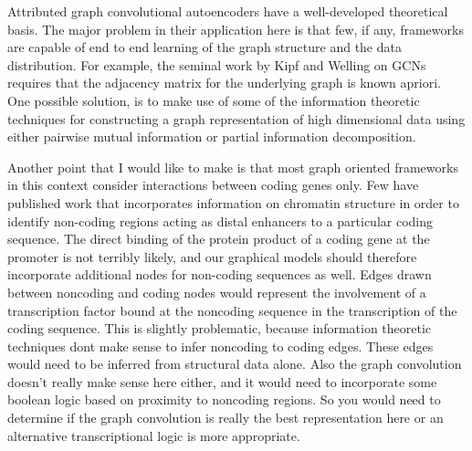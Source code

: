 \documentclass{article}
\begin{document}
Attributed graph convolutional autoencoders have a well-developed theoretical basis. The major problem in their application here is that few, if any, frameworks are capable of end to end learning of the graph structure and the data distribution. For example, the seminal work by Kipf and Welling on GCNs requires that the adjacency matrix for the underlying graph is known apriori. One possible solution, is to make use of some of the information theoretic techniques for constructing a graph representation of high dimensional data using either pairwise mutual information or partial information decomposition. 

Another point that I would like to make is that most graph oriented frameworks in this context consider interactions between coding genes only. Few have published work that incorporates information on chromatin structure in order to identify non-coding regions acting as distal enhancers to a particular coding sequence. The direct binding of the protein product of a coding gene at the promoter is not terribly likely, and our graphical models should therefore incorporate additional nodes for non-coding sequences as well. Edges drawn between noncoding and coding nodes would represent the involvement of a transcription factor bound at the noncoding sequence in the transcription of the coding sequence. This is slightly problematic, because information theoretic techniques dont make sense to infer noncoding to coding edges. These edges would need to be inferred from structural data alone. Also the graph convolution doesn't really make sense here either, and it would need to incorporate some boolean logic based on proximity to noncoding regions. So you would need to determine if the graph convolution is really the best representation here or an alternative transcriptional logic is more appropriate.
\end{document}

